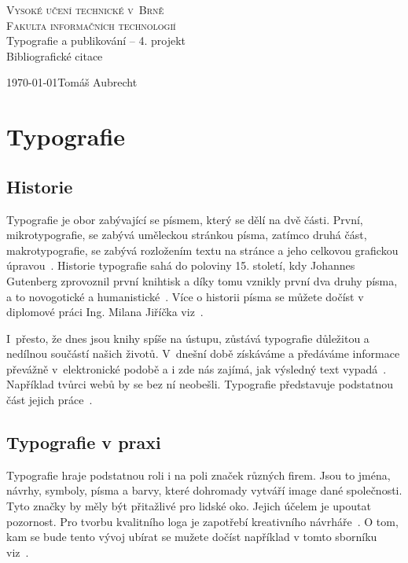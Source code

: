 \documentclass[a4paper, 11pt]{article}
\begin{document}
	\begin{titlepage}
	\begin{center}
			{\Huge\textsc{Vysoké učení technické v~Brně}}\\
			\medskip
			{\huge\textsc{Fakulta informačních technologií}}\\
			{\LARGE
			Typografie a publikování -- 4. projekt}\\
			\medskip
			{\Huge Bibliografické citace}\\
	\end{center}
	{\Large \today \hfill Tomáš Aubrecht}
	\pagestyle{plain}
	\end{titlepage}

	\section*{Typografie}
	
	\subsection*{Historie}
	Typografie je obor zabývající se písmem, který se dělí na dvě části. První, mikrotypografie, se zabývá uměleckou stránkou písma, zatímco druhá část, makrotypografie, se zabývá rozložením textu na stránce a jeho celkovou grafickou úpravou~\cite{Bringhurst:The_Elements_of_Typographic_Style}. Historie typografie sahá do poloviny 15. století, kdy Johannes Gutenberg zprovoznil první knihtisk a díky tomu vznikly první dva druhy písma, a to novogotické a humanistické~\cite{Wiki:Typography}. Více o historii písma se můžete dočíst v diplomové práci Ing. Milana Jiříčka viz~\cite{Jiricek:Font}.
	
	I~přesto, že dnes jsou knihy spíše na ústupu, zůstává typografie důležitou a nedílnou součástí našich životů. V~dnešní době získáváme a předáváme informace převážně v~elektronické podobě a i zde nás zajímá, jak výsledný text vypadá~\cite{Rihosek:Webova_grafika}. Například tvůrci webů by se bez ní neobešli. Typografie představuje podstatnou část jejich práce~\cite{Rutter:WebTypography}.
	
	\subsection*{Typografie v praxi}
	Typografie hraje podstatnou roli i na poli značek různých firem. Jsou to jména, návrhy, symboly, písma a barvy, které dohromady vytváří image dané společnosti. Tyto značky by měly být přitažlivé pro lidské oko. Jejich účelem je upoutat pozornost. Pro tvorbu kvalitního loga je zapotřebí kreativního návrháře~\cite{CA:Typography_in_Branding}. O tom, kam se bude tento vývoj ubírat se mužete dočíst například v tomto sborníku viz~\cite{Navratilova:Strojova_civilizace}.
	
\end{document}
